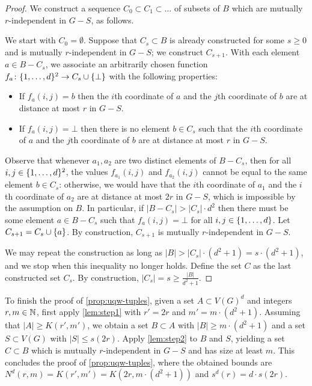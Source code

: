 \begin{proof}
We construct a sequence $C_0\subset C_1\subset \ldots$ of subsets of $B$ which are mutually $r$-independent in $G-S$, as follows.

We start with $C_0=\emptyset$. Suppose that $C_s\subset B$ is 
 already constructed for some $s\ge 0$
 and is mutually $r$-independent in $G-S$; we construct $C_{s+1}$. With each element $a\in B-C_s$,
we associate an arbitrarily chosen function $f_a\colon \{1,\ldots,d\}^2\to C_s\cup \{\bot\}$
with the following properties:
\begin{itemize}
	\item If $f_a(i,j)=b$ then the $i$th coordinate of $a$
	and the $j$th coordinate of $b$ are at distance at most $r$
	in $G-S$.
	\item If $f_a(i,j)=\bot$ then there is no element $b\in C_s$ 
	such that the $i$th coordinate of $a$ and the $j$th coordinate of $b$ are at distance at most $r$ in $G-S$.	
\end{itemize}
Observe that whenever $a_1, a_2$ are two distinct elements of $B-C_s$,
then for all $i,j\in \{1,\ldots,d\}^2$, the values $f_{a_1}(i,j)$ and $f_{a_2}(i,j)$
cannot be equal to the same element $b\in C_s$:
otherwise, we would have that the $i$th coordinate of $a_1$
and the $i$th coordinate of $a_2$ are at distance at most $2r$
in $G-S$, which is impossible by the assumption on $B$.
In particular, if $|B-C_s|> |C_s|\cdot d^2$
then there must be some element  $a\in B-C_s$  
such that $f_a(i,j)=\bot$  for all $i,j\in\{1,\ldots,d\}$.
Let $C_{s+1}=C_s\cup \{a\}$.
By construction, $C_{s+1}$ is mutually $r$-independent in $G-S$.

We may repeat the construction as long as $|B|>|C_s|\cdot (d^2+1)=s\cdot (d^2+1)$, and we stop when this inequality no longer holds. Define the set $C$ as the last constructed set $C_s$.
By construction, $|C_s|=s\ge 
\frac{|B|}{d^2+1}$.	
\end{proof}

To finish the proof of \cref{prop:uqw-tuples},
given a set $A\subset V(G)^d$ and integers $r,m\in\mathbb{N}$,
first apply 
\cref{lem:step1} 
  with $r'=2r$ and
 $m'= m\cdot (d^2+1)$.
 Assuming that $|A|\ge K(r',m')$, 
we obtain a set $B\subset A$ with $|B|\ge m\cdot (d^2+1)$ and a set $S\subset V(G)$ with $|S|\le s(2r)$.
Apply \cref{lem:step2} to $B$ and $S$, yielding a set $C\subset B$ which is mutually $r$-independent in $G-S$ and has size at least $m$. This concludes the proof of \cref{prop:uqw-tuples},
where the obtained bounds are $N^d(r,m)=K(r',m')=K(2r,m\cdot (d^2+1))$ and $s^d(r)=d\cdot s(2r)$.


